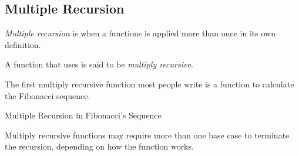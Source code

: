 \subsection{Multiple Recursion}\label{subsec:Multiple_Recursion}
\begin{definition}\label{def:Multiple_Recursion}
  \emph{Multiple recursion} is when a functions is applied more than once in its own definition.

  \begin{remark}\label{rmk:Multiply_Recursive}
    A function that uses  is said to be \emph{multiply recursive}.
  \end{remark}
\end{definition}

The first multiply recursive function most people write is a function to calculate the Fibonacci sequence.
\begin{listing}[h!tbp]
\caption{Multiple Recursion in Fibonacci's Sequence}
\label{lst:Multiple_Recursion-Fibonacci}
\end{listing}

Multiply recursive functions may require more than one base case to terminate the recursion, depending on how the function works.

